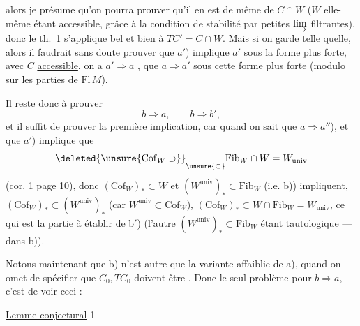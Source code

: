 alors je présume qu'on pourra prouver
qu'il en est de même de $C\cap W$ ($W$
elle-même étant accessible, grâce à la
condition de stabilité par petites $\varinjlim$
filtrantes), donc le th.~1 s'applique bel et
bien à $TC'=C\cap W$. Mais si on garde
 telle quelle, alors il faudrait sans doute
prouver que $a'$) \uline{implique} $a'$ sous la forme
plus forte, avec $C$ \uline{accessible}.   on a $a'\Rightarrow a$ , 
 que $a\Rightarrow a'$ sous cette forme plus forte
 (modulo    sur les
parties  de $\mathrm{Fl}\,M$).

Il reste donc à prouver
\[
 b\Rightarrow a,\qquad b\Rightarrow b',
\]
et il suffit de prouver la première implication,
car quand on sait que $a\Rightarrow a''$), et que $a'$)
implique que
\[
 \deleted{\unsure{\mathrm{Cof}_W\supset}}\underset{\unsure{\subset}}{\vphantom{F}}\mathrm{Fib}_W\cap W=W_{\mathrm{univ}}
\]
(cor. 1 page 10), donc $(\mathrm{Cof}_W)_*\subset W$ et $(W^{\mathrm{univ}})_*\subset\mathrm{Fib}_W$
 (i.e. b)) impliquent, $(\mathrm{Cof}_W)_*\subset(W^{\mathrm{univ}})_*$
(car $W^{\mathrm{univ}}\subset\mathrm{Cof}_W$), 
$(\mathrm{Cof}_W)_*\subset W\cap\mathrm{Fib}_W=W_{\mathrm{univ}}$,
ce qui est la partie à établir de b$'$) (l'autre
$(W^{\mathrm{univ}})_*\subset\mathrm{Fib}_W$ étant tautologique ---
 dans b)).

Notons maintenant que b) n'est autre que
la variante affaiblie de a), quand on omet
de spécifier que $C_0,TC_0$ doivent être .
Donc le seul problème pour $b\Rightarrow a$,
c'est de voir ceci :

\uline{Lemme conjectural} \textcircled{1} 


